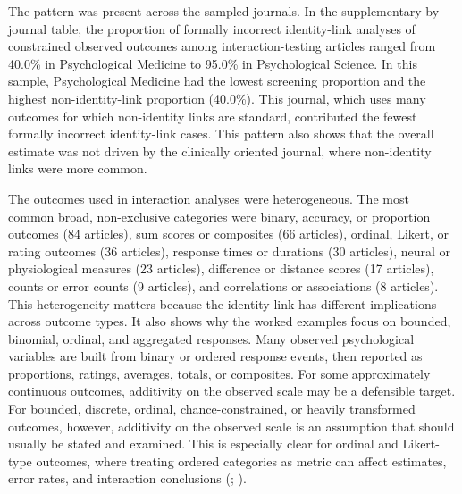 \documentclass[
  man,
  longtable,
  nolmodern,
  notxfonts,
  notimes,
  colorlinks=true,linkcolor=blue,citecolor=blue,urlcolor=blue]{apa7}
\begin{document}
The pattern was present across the sampled journals. In the
supplementary by-journal table, the proportion of formally incorrect
identity-link analyses of constrained observed outcomes among
interaction-testing articles ranged from 40.0\% in Psychological
Medicine to 95.0\% in Psychological Science. In this sample,
Psychological Medicine had the lowest screening proportion and the
highest non-identity-link proportion (40.0\%). This journal, which uses
many outcomes for which non-identity links are standard, contributed the
fewest formally incorrect identity-link cases. This pattern also shows
that the overall estimate was not driven by the clinically oriented
journal, where non-identity links were more common.

The outcomes used in interaction analyses were heterogeneous. The most
common broad, non-exclusive categories were binary, accuracy, or
proportion outcomes (84 articles), sum scores or composites (66
articles), ordinal, Likert, or rating outcomes (36 articles), response
times or durations (30 articles), neural or physiological measures (23
articles), difference or distance scores (17 articles), counts or error
counts (9 articles), and correlations or associations (8 articles). This
heterogeneity matters because the identity link has different
implications across outcome types. It also shows why the worked examples
focus on bounded, binomial, ordinal, and aggregated responses. Many
observed psychological variables are built from binary or ordered
response events, then reported as proportions, ratings, averages,
totals, or composites. For some approximately continuous outcomes,
additivity on the observed scale may be a defensible target. For
bounded, discrete, ordinal, chance-constrained, or heavily transformed
outcomes, however, additivity on the observed scale is an assumption
that should usually be stated and examined. This is especially clear for
ordinal and Likert-type outcomes, where treating ordered categories as
metric can affect estimates, error rates, and interaction conclusions
(;
).
\end{document}
